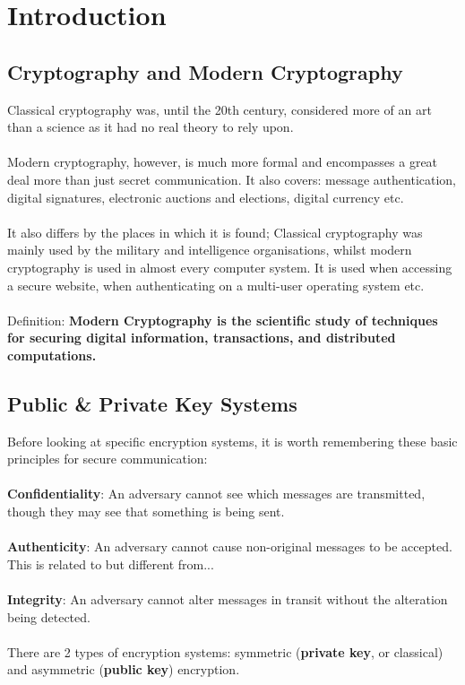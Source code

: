 \chapter{Introduction}
\section{Cryptography and Modern Cryptography}
    
    Classical cryptography was, until the 20th century, considered more of an art than a science as it had no real theory to rely upon.\\
    \\
    Modern cryptography, however, is much more formal and encompasses a great deal more than just secret communication. It also covers: message authentication, digital signatures, electronic auctions and elections, digital currency etc.\\
    \\
    It also differs by the places in which it is found; Classical cryptography was mainly used by the military and intelligence organisations, whilst modern cryptography is used in almost every computer system. It is used when accessing a secure website, when authenticating on a multi-user operating system etc.\\
    \\
    Definition: \textbf{Modern Cryptography is the scientific study of techniques for securing digital information, transactions, and distributed computations.}
    
\section{Public \& Private Key Systems}
    Before looking at specific encryption systems, it is worth remembering these basic principles for secure communication:\\
    \\
    \textbf{Confidentiality}: An adversary cannot see which messages are transmitted, though they may see that something is being sent.\\
    \\
    \textbf{Authenticity}: An adversary cannot cause non-original messages to be accepted. This is related to but different from...\\
    \\
    \textbf{Integrity}: An adversary cannot alter messages in transit without the alteration being detected.\\
    \\
    There are 2 types of encryption systems: symmetric (\textbf{private key}, or classical) and asymmetric (\textbf{public key}) encryption.\\

